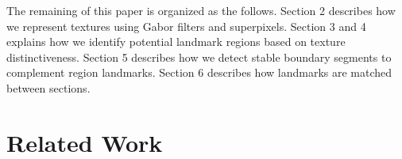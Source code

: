 \documentclass{llncs}
\begin{document}


The remaining of this paper is organized as the follows. Section 2 describes how we represent textures using Gabor filters and superpixels. Section 3 and 4 explains how we identify potential landmark regions based on texture distinctiveness. Section 5 describes how we detect stable boundary segments to complement region landmarks. Section 6 describes how landmarks are matched between sections.



\section{Related Work}

%
\end{document}
